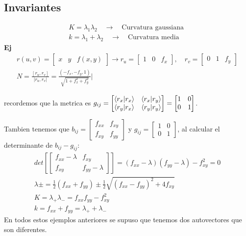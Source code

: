\documentclass{article}
\begin{document}
\subsection{Invariantes }
\begin{gather}
   K = \lambda_1 \lambda_2 \quad \rightarrow \quad \text{Curvatura gaussiana }\\
   k = \lambda_1 + \lambda_2 \quad \rightarrow \quad \text{Curvatura media}
\end{gather}
\textbf{Ej }
\begin{gather}
  r\left(u,v\right)=\begin{bmatrix} x & y & f\left(x,y\right) \end{bmatrix} \rightarrow r_u = \begin{bmatrix} 1 & 0 & f_x \end{bmatrix},\quad r_v = \begin{bmatrix} 0 & 1 & f_y \end{bmatrix}\\
  N = \frac{[r_u,r_v ]}{\left|{r_u,r_v }\right|}= \frac{(-f_x, -f_y, 1 )}{\sqrt{1+f_x ^ {2 }+ f_y ^ {2 }} }|  
\end{gather}

recordemos que la metrica es $ g _{ij } = \begin{bmatrix}
    \bra{r_x}\ket{r_x }  & \bra{r_x }\ket{r_y }  \\
    \bra{r_ y }\ket{r_x }  & \bra{r_y }\ket{r_y } 
\end{bmatrix} = \begin{bmatrix}
    1 & 0 \\
    0 & 1
\end{bmatrix}    $. 

Tambien tenemos que $ b _{ij }  = \begin{bmatrix}
    f _{xx }  & f _{xy }  \\
    f _{xy }  & f _{yy } 
\end{bmatrix}   $ y $ g _{ij }  = \begin{bmatrix}
    1  & 0  \\
    0  & 1 
\end{bmatrix}   $, al calcular el determinante de $ b _{ij } - g _{ij }  $:
\begin{gather}
  det \left[\begin{bmatrix}
      f _{xx } - \lambda & f _{xy }  \\
      f _{xy }  & f _{yy } - \lambda
  \end{bmatrix}  \right] = (f _{xx } - \lambda) (f _{yy } - \lambda) - f _{xy } ^ {2 } = 0 \\
  \lambda \pm  = \frac{1}{2}(f _{xx } + f _{yy } )\pm \frac{1}{2}\sqrt{(f _{xx } - f _{yy } )^ {2 }+ 4 f _{xy } } \\
  K = \lambda _+ \lambda_- = f _{xx } f _{yy } - f _{xy } ^ {2 }\\
  k = f _{xx } + f _{yy }  = \lambda_+ + \lambda_-
\end{gather}
En todos estos ejemplos anteriores se supuso que tenemos dos autovectores que son diferentes.
\end{document}

